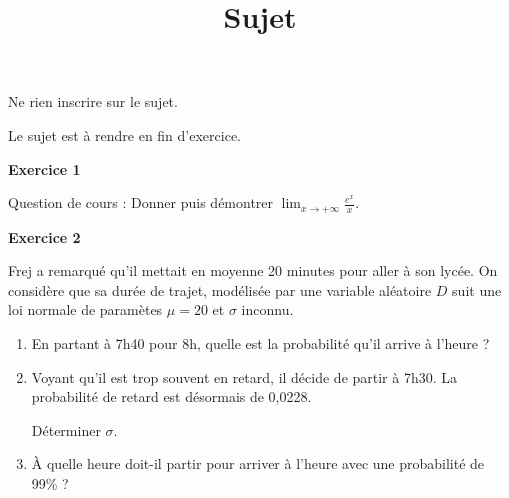 \documentclass[12pt,a4paper,french]{article}
\author{}
\title{Sujet \no{12}}
\date{}
\begin{document}
\maketitle
\begin{center}Ne rien inscrire sur le sujet.

  Le sujet est à rendre en fin d'exercice.
\end{center}

\bigskip

\textbf{Exercice 1}

Question de cours : Donner puis démontrer
$\lim_{x\to+\infty}\frac{e^x}x$.

\medskip

\textbf{Exercice 2}

Frej a remarqué qu'il mettait en moyenne 20 minutes pour aller à son
lycée. On considère que sa durée de trajet, modélisée par une variable
aléatoire $D$ suit une loi normale de paramètes $\mu = 20$ et $\sigma$
inconnu.

\begin{enumerate}
  \item En partant à 7h40 pour 8h, quelle est la probabilité qu'il
    arrive à l'heure ?
  \item Voyant qu'il est trop souvent en retard, il décide de partir à
    7h30. La probabilité de retard est désormais de 0,0228.

    Déterminer $\sigma$.
  \item À quelle heure doit-il partir pour arriver à l'heure avec une
    probabilité de 99\% ?
\end{enumerate}
\end{document}
